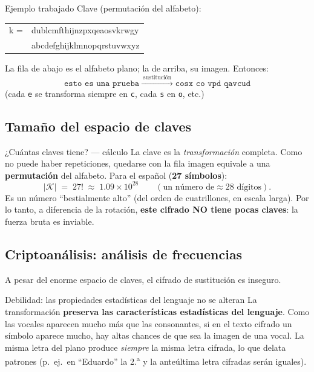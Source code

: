 \documentclass[11pt,a4paper]{article}
\newcommand{\Kset}{\mathcal{K}}
\begin{document}
\begin{practbox}{Ejemplo trabajado}
Clave (permutación del alfabeto):
\begin{center}\ttfamily
\begin{tabular}{ll}
k = & dublcmfthijnzpxqeaosvkrwgy\\
    & abcdefghijklmnopqrstuvwxyz
\end{tabular}
\end{center}
La fila de abajo es el alfabeto plano; la de arriba, su imagen. Entonces:
\[
  \texttt{esto es una prueba}\;\xrightarrow{\;\text{sustitución}\;}\;\texttt{cosx co vpd qavcud}
\]
(cada \texttt{e} se transforma siempre en \texttt{c}, cada \texttt{s} en \texttt{o}, etc.)
\end{practbox}

\subsection{Tamaño del espacio de claves}
\begin{practbox}{¿Cuántas claves tiene? — cálculo}
La clave es la \emph{transformación} completa. Como no puede haber repeticiones, quedarse con
la fila imagen equivale a una \textbf{permutación} del alfabeto. Para el español
(\textbf{27 símbolos}):
\[
  |\Kset| \;=\; 27! \;\approx\; 1.09\times10^{28}
  \qquad(\text{un número de} \approx 28 \text{ dígitos}).
\]
Es un número ``bestialmente alto'' (del orden de cuatrillones, en escala larga). Por lo tanto,
a diferencia de la rotación, \textbf{este cifrado NO tiene pocas claves}: la fuerza bruta es
inviable.
\end{practbox}

\subsection{Criptoanálisis: análisis de frecuencias}
A pesar del enorme espacio de claves, el cifrado de sustitución es inseguro.

\begin{warnbox}{Debilidad: las propiedades estadísticas del lenguaje no se alteran}
La transformación \textbf{preserva las características estadísticas del lenguaje}. Como las
vocales aparecen mucho más que las consonantes, si en el texto cifrado un símbolo aparece
mucho, hay altas chances de que sea la imagen de una vocal. La misma letra del plano produce
\emph{siempre} la misma letra cifrada, lo que delata patrones (p.\ ej.\ en ``Eduardo'' la 2.\textsuperscript{a}
y la anteúltima letra cifradas serán iguales).
\end{warnbox}
\end{document}
